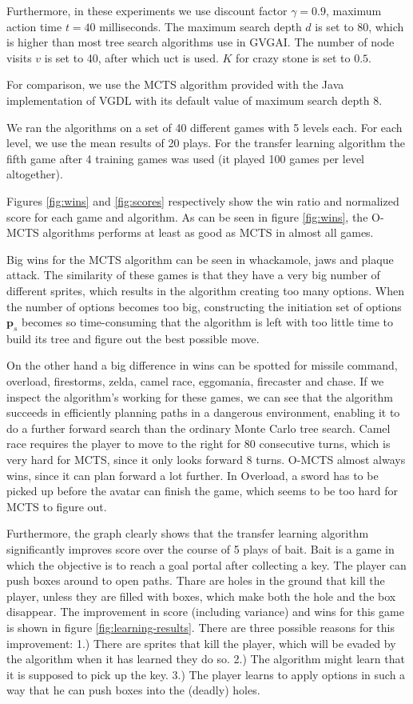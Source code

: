 Furthermore, in these experiments we use discount factor $\gamma = 0.9$,
maximum action time $t = 40$ milliseconds. The maximum search depth $d$
is set to 80, which is higher than most tree search algorithms use in GVGAI. The
number of node visits $v$ is set to 40, after which \textsf{uct} is used. $K$
for crazy stone is set to $0.5$.

For comparison, we use the MCTS algorithm provided with the Java implementation
of VGDL with its default value of maximum search depth 8. 

We ran the algorithms on a set of 40 different games with 5 levels each. For
each level, we use the mean results of 20 plays. For the transfer learning
algorithm the fifth game after 4 training games was used (it played 100
games per level altogether).

Figures \ref{fig:wins} and \ref{fig:scores} respectively show the win ratio and
normalized score for each game and algorithm. As can be seen in figure
\ref{fig:wins}, the O-MCTS algorithms performs at least as good as MCTS in
almost all games. 

Big wins for the MCTS algorithm can be seen in whackamole, jaws and plaque
attack. The similarity of these games is that they have a very big number of
different sprites, which results in the algorithm creating too many options.
When the number of options becomes too big, constructing the initiation set of
options $\mathbf{p}_s$ becomes so time-consuming that the algorithm is left with
too little time to build its tree and figure out the best possible move.

On the other hand a big difference in wins can be spotted for missile command,
overload, firestorms, zelda, camel race, eggomania, firecaster and chase. If we
inspect the algorithm's working for these games, we can see that the algorithm
succeeds in efficiently planning paths in a dangerous environment, enabling it
to do a further forward search than the ordinary Monte Carlo tree search. Camel
race requires the player to move to the right for 80 consecutive turns, which is
very hard for MCTS, since it only looks forward 8 turns. O-MCTS almost always
wins, since it can plan forward a lot further. In Overload, a sword has to be
picked up before the avatar can finish the game, which seems to be too hard for
MCTS to figure out.

Furthermore, the graph clearly shows that the transfer learning algorithm
significantly improves score over the course of 5 plays of bait.  Bait is a game
in which the objective is to reach a goal portal after collecting a key. The
player can push boxes around to open paths.  Thare are holes in the ground that
kill the player, unless they are filled with boxes, which make both the hole and
the box disappear.  The improvement in score (including variance) and wins for
this game is shown in figure \ref{fig:learning-results}. There are three
possible reasons for this improvement: 1.) There are sprites that kill the
player, which will be evaded by the algorithm when it has learned they do so.
2.) The algorithm might learn that it is supposed to pick up the key. 3.) The
player learns to apply options in such a way that he can push boxes into the
(deadly) holes.
